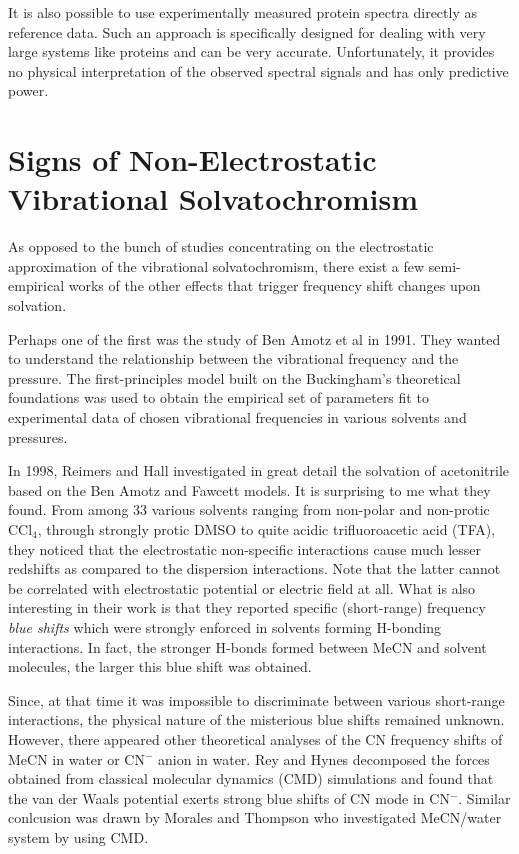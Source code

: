 \documentclass[a4paper,titlepage,twoside,fleqn,12pt]{book}
\begin{document}
\begin{refsection}
It is also possible to use experimentally measured protein spectra directly as reference data. 
Such an approach is specifically designed for dealing with very large systems like proteins and
can be very accurate. Unfortunately, it provides no physical interpretation of the observed
spectral signals and has only predictive power.

\section{Signs of Non-Electrostatic Vibrational Solvatochromism}
As opposed to the bunch of studies concentrating on the electrostatic
approximation of the vibrational solvatochromism, there exist a few 
semi-empirical works of the other effects that trigger frequency shift
changes upon solvation. 

Perhaps one of the first was the study of Ben Amotz et al in 1991.
They wanted to understand the relationship between the vibrational frequency
and the pressure. The first-principles model built on the Buckingham's theoretical
foundations was used to obtain the empirical set of parameters fit to
experimental data of chosen vibrational frequencies in various solvents
and pressures.

In 1998, Reimers and Hall investigated in great detail the solvation of acetonitrile 
based on the Ben Amotz and Fawcett models. It is surprising to me what they found.
From among 33 various solvents ranging from non-polar and non-protic CCl$_4$, through strongly protic
DMSO to quite acidic trifluoroacetic acid (TFA), they noticed that the electrostatic
non-specific interactions cause much lesser redshifts as compared to the dispersion
interactions. Note that the latter cannot be correlated with electrostatic potential
or electric field at all. What is also interesting in their work is that they 
reported specific (short-range) frequency \emph{blue shifts} which were strongly enforced
in solvents forming H-bonding interactions. In fact, the stronger H-bonds formed between MeCN
and solvent molecules, the larger this blue shift was obtained.

Since, at that time it was impossible to discriminate between various short-range
interactions, the physical nature of the misterious blue shifts remained unknown.
However, there appeared other theoretical analyses of the CN frequency shifts of MeCN in water
or CN$^-$ anion in water. Rey and Hynes\citep{Rey.Hynes.JCP.1998} decomposed the forces obtained from classical molecular dynamics
(CMD) simulations and found that the van der Waals potential exerts strong blue shifts of CN mode in CN$^-$.
Similar conlcusion was drawn by Morales and Thompson who investigated MeCN/water system by 
using CMD. 


\end{refsection}
\end{document}
